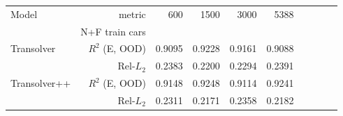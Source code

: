 \begin{tabular}{lrrrrrrrrr}
\toprule
Model & metric & 600 & 1500 & 3000 & 5388 \\
& N+F train cars & & & & \\
\midrule
Transolver & $R^2$ (E, OOD) & 0.9095 & 0.9228 & 0.9161 & 0.9088 \\
 & Rel-$L_2$ & 0.2383 & 0.2200 & 0.2294 & 0.2391 \\
Transolver++ & $R^2$ (E, OOD) & 0.9148 & 0.9248 & 0.9114 & 0.9241 \\
 & Rel-$L_2$ & 0.2311 & 0.2171 & 0.2358 & 0.2182 \\
\bottomrule
\end{tabular}

